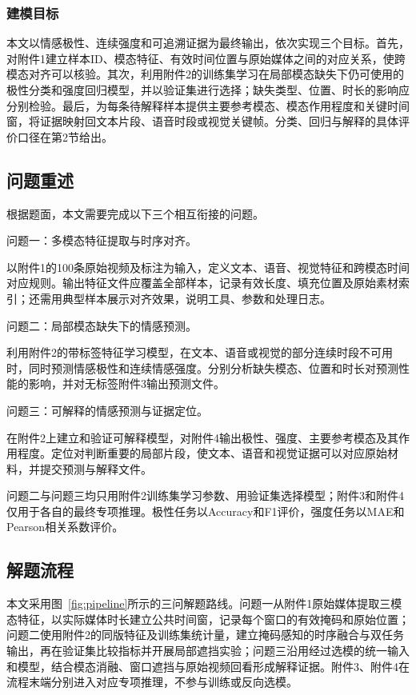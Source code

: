 \documentclass{gmcmthesis}
\begin{document}
\subsubsection{建模目标}
本文以情感极性、连续强度和可追溯证据为最终输出，依次实现三个目标。首先，对附件1建立样本ID、模态特征、有效时间位置与原始媒体之间的对应关系，使跨模态对齐可以核验。其次，利用附件2的训练集学习在局部模态缺失下仍可使用的极性分类和强度回归模型，并以验证集进行选择；缺失类型、位置、时长的影响应分别检验。最后，为每条待解释样本提供主要参考模态、模态作用程度和关键时间窗，将证据映射回文本片段、语音时段或视觉关键帧。分类、回归与解释的具体评价口径在第2节给出。

\subsection{问题重述}
根据题面，本文需要完成以下三个相互衔接的问题。

问题一：多模态特征提取与时序对齐。

以附件1的100条原始视频及标注为输入，定义文本、语音、视觉特征和跨模态时间对应规则。输出特征文件应覆盖全部样本，记录有效长度、填充位置及原始素材索引；还需用典型样本展示对齐效果，说明工具、参数和处理日志。

问题二：局部模态缺失下的情感预测。

利用附件2的带标签特征学习模型，在文本、语音或视觉的部分连续时段不可用时，同时预测情感极性和连续情感强度。分别分析缺失模态、位置和时长对预测性能的影响，并对无标签附件3输出预测文件。

问题三：可解释的情感预测与证据定位。

在附件2上建立和验证可解释模型，对附件4输出极性、强度、主要参考模态及其作用程度。定位对判断重要的局部片段，使文本、语音和视觉证据可以对应原始材料，并提交预测与解释文件。

问题二与问题三均只用附件2训练集学习参数、用验证集选择模型；附件3和附件4仅用于各自的最终专项推理。极性任务以Accuracy和F1评价，强度任务以MAE和Pearson相关系数评价。

\subsection{解题流程}
本文采用图~\ref{fig:pipeline}所示的三问解题路线。问题一从附件1原始媒体提取三模态特征，以实际媒体时长建立公共时间窗，记录每个窗口的有效掩码和原始位置；问题二使用附件2的同版特征及训练集统计量，建立掩码感知的时序融合与双任务输出，再在验证集比较指标并开展局部遮挡实验；问题三沿用经过选模的统一输入和模型，结合模态消融、窗口遮挡与原始视频回看形成解释证据。附件3、附件4在流程末端分别进入对应专项推理，不参与训练或反向选模。
\end{document}
